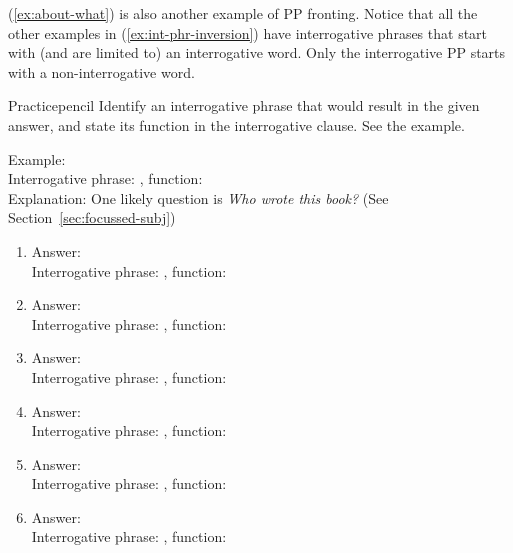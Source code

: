 (\ref{ex:about-what}) is also another example of PP fronting. Notice that all the other examples in (\ref{ex:int-phr-inversion}) have interrogative phrases that start with (and are limited to) an interrogative word. Only the interrogative PP  starts with a non-interrogative word.

    \begin{tblsframedsymbol}{Practice}{pencil}
        \setlength{\parindent}{1.5em}
        \noindent
        Identify an interrogative phrase that would result in the given answer, and state its function in the interrogative clause. See the example.

        \phantom{x}

        Example: \\
        \phantom{xxx}Interrogative phrase: \emph{\textsf{}}, function: \emph{\textsf{}}\\
        \phantom{xxx}Explanation: One likely question is \textit{\emph{Who} wrote this book?} (See Section~\ref{sec:focussed-subj})

        \begin{enumerate}[noitemsep, leftmargin=*]
            \item Answer: \\
            Interrogative phrase: \gap, function: \gap

            \item Answer: \\
            Interrogative phrase: \gap, function: \gap

            \item Answer: \\
            Interrogative phrase: \gap, function: \gap

            \item Answer: \\
            Interrogative phrase: \gap, function: \gap

            \item Answer: \\
            Interrogative phrase: \gap, function: \gap

            \item Answer: \\
            Interrogative phrase: \gap, function: \gap


\end{enumerate}
\end{tblsframedsymbol}
